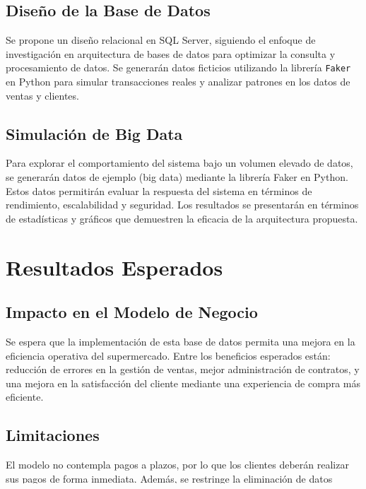 \documentclass[12pt]{article}
\begin{document}
\subsection{Diseño de la Base de Datos}
Se propone un diseño relacional en SQL Server, siguiendo el enfoque de investigación en arquitectura de bases de datos para optimizar la consulta y procesamiento de datos. Se generarán datos ficticios utilizando la librería \texttt{Faker} en Python para simular transacciones reales y analizar patrones en los datos de ventas y clientes.

\subsection{Simulación de Big Data}
Para explorar el comportamiento del sistema bajo un volumen elevado de datos, se generarán datos de ejemplo (big data) mediante la librería Faker en Python. Estos datos permitirán evaluar la respuesta del sistema en términos de rendimiento, escalabilidad y seguridad. Los resultados se presentarán en términos de estadísticas y gráficos que demuestren la eficacia de la arquitectura propuesta.

\section{Resultados Esperados}

\subsection{Impacto en el Modelo de Negocio}
Se espera que la implementación de esta base de datos permita una mejora en la eficiencia operativa del supermercado. Entre los beneficios esperados están: reducción de errores en la gestión de ventas, mejor administración de contratos, y una mejora en la satisfacción del cliente mediante una experiencia de compra más eficiente.

\subsection{Limitaciones}
El modelo no contempla pagos a plazos, por lo que los clientes deberán realizar sus pagos de forma inmediata. Además, se restringe la eliminación de datos críticos para asegurar la trazabilidad y consistencia histórica en la base de datos.

\section{Conclusiones y Recomendaciones}
\end{document}
